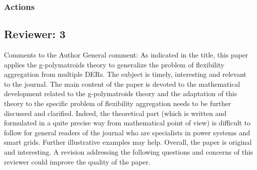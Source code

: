 
\subsubsection{Actions}









\subsection{Reviewer: 3}

Comments to the Author
General comment:
As indicated in the title, this paper applies the g-polymatroids theory to generalize the problem of flexibility aggregation from multiple DERs.
The subject is timely, interesting and relevant to the journal. The main content of the paper is devoted to the mathematical development related to the g-polymatroids theory and the adaptation of this theory to the specific problem of flexibility aggregation needs to be further discussed and clarified. Indeed, the theoretical part (which is written and formulated in a quite precise way from mathematical point of view) is difficult to follow for general readers of the journal who are specialists in power systems and smart grids. Further illustrative examples may help.
Overall, the paper is original and interesting. A revision addressing the following questions and concerns of this reviewer could improve the quality of the paper.




